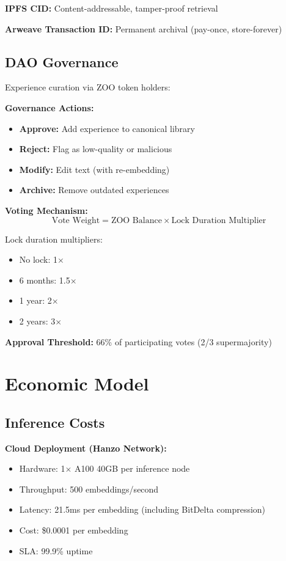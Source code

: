 \documentclass[11pt,a4paper]{article}
\begin{document}
\textbf{IPFS CID:} Content-addressable, tamper-proof retrieval

\textbf{Arweave Transaction ID:} Permanent archival (pay-once, store-forever)

\subsection{DAO Governance}

Experience curation via ZOO token holders:

\textbf{Governance Actions:}
\begin{itemize}
\item \textbf{Approve:} Add experience to canonical library
\item \textbf{Reject:} Flag as low-quality or malicious
\item \textbf{Modify:} Edit text (with re-embedding)
\item \textbf{Archive:} Remove outdated experiences
\end{itemize}

\textbf{Voting Mechanism:}
\begin{equation}
\text{Vote Weight} = \text{ZOO Balance} \times \text{Lock Duration Multiplier}
\end{equation}

Lock duration multipliers:
\begin{itemize}
\item No lock: 1$\times$
\item 6 months: 1.5$\times$
\item 1 year: 2$\times$
\item 2 years: 3$\times$
\end{itemize}

\textbf{Approval Threshold:} 66\% of participating votes (2/3 supermajority)

\section{Economic Model}

\subsection{Inference Costs}

\textbf{Cloud Deployment (Hanzo Network):}
\begin{itemize}
\item Hardware: 1$\times$ A100 40GB per inference node
\item Throughput: 500 embeddings/second
\item Latency: 21.5ms per embedding (including BitDelta compression)
\item Cost: \$0.0001 per embedding
\item SLA: 99.9\% uptime
\end{itemize}
\end{document}
